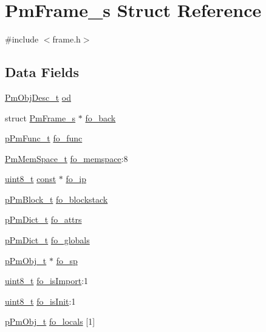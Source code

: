 \hypertarget{struct_pm_frame__s}{\section{Pm\-Frame\-\_\-s Struct Reference}
\label{struct_pm_frame__s}
}


{\ttfamily \#include $<$frame.\-h$>$}

\subsection*{Data Fields}
\begin{DoxyCompactItemize}
\item 
\hyperlink{obj_8h_a72d816790acd8eb550fb25268c2b3489}{Pm\-Obj\-Desc\-\_\-t} \hyperlink{struct_pm_frame__s_a0850b7a1ffb7143d385aa9b438a0afa4}{od}
\item 
struct \hyperlink{struct_pm_frame__s}{Pm\-Frame\-\_\-s} $\ast$ \hyperlink{struct_pm_frame__s_ab9973b6a1a9107539de3ffa4b181a3ff}{fo\-\_\-back}
\item 
\hyperlink{func_8h_a31ea34c165a41eee786d036607d224b3}{p\-Pm\-Func\-\_\-t} \hyperlink{struct_pm_frame__s_a019782d26f22cdd2a08464d9ad463fdc}{fo\-\_\-func}
\item 
\hyperlink{mem_8h_a9c68f72c120fc5a782d464c144aafa2b}{Pm\-Mem\-Space\-\_\-t} \hyperlink{struct_pm_frame__s_ae2f6eee1acc2c6d1de398ce187e55100}{fo\-\_\-memspace}\-:8
\item 
\hyperlink{stdint_8h_aba7bc1797add20fe3efdf37ced1182c5}{uint8\-\_\-t} \hyperlink{group___n_a_m_e_ga7ae6d0e43244213b34de2c2b9aa30da6}{const} $\ast$ \hyperlink{struct_pm_frame__s_a84b1a72fd9d6791fe887d05c5848d8c6}{fo\-\_\-ip}
\item 
\hyperlink{frame_8h_aceaac1fe42f08b3880cfc27d3db6075f}{p\-Pm\-Block\-\_\-t} \hyperlink{struct_pm_frame__s_aff746256e6c9b88ca389f5e61468501b}{fo\-\_\-blockstack}
\item 
\hyperlink{dict_8h_a32b81dc9e05f3a84863319301daf749b}{p\-Pm\-Dict\-\_\-t} \hyperlink{struct_pm_frame__s_ac31f338509fd3301afdb42bcc6c2517e}{fo\-\_\-attrs}
\item 
\hyperlink{dict_8h_a32b81dc9e05f3a84863319301daf749b}{p\-Pm\-Dict\-\_\-t} \hyperlink{struct_pm_frame__s_aac8ced4f070e0e9d071fa9c361195b71}{fo\-\_\-globals}
\item 
\hyperlink{obj_8h_af293479fa3f9d92b941ee7445ad3960e}{p\-Pm\-Obj\-\_\-t} $\ast$ \hyperlink{struct_pm_frame__s_aa256889546729dcf74733e782b03e88b}{fo\-\_\-sp}
\item 
\hyperlink{stdint_8h_aba7bc1797add20fe3efdf37ced1182c5}{uint8\-\_\-t} \hyperlink{struct_pm_frame__s_aa4786cc606fdf9b74d60454287788854}{fo\-\_\-is\-Import}\-:1
\item 
\hyperlink{stdint_8h_aba7bc1797add20fe3efdf37ced1182c5}{uint8\-\_\-t} \hyperlink{struct_pm_frame__s_a3447b81b1d8fbf95cae30d054b81c168}{fo\-\_\-is\-Init}\-:1
\item 
\hyperlink{obj_8h_af293479fa3f9d92b941ee7445ad3960e}{p\-Pm\-Obj\-\_\-t} \hyperlink{struct_pm_frame__s_adfe4e983a61e7615ffa0219baf8d6632}{fo\-\_\-locals} \mbox{[}1\mbox{]}
\end{DoxyCompactItemize}



